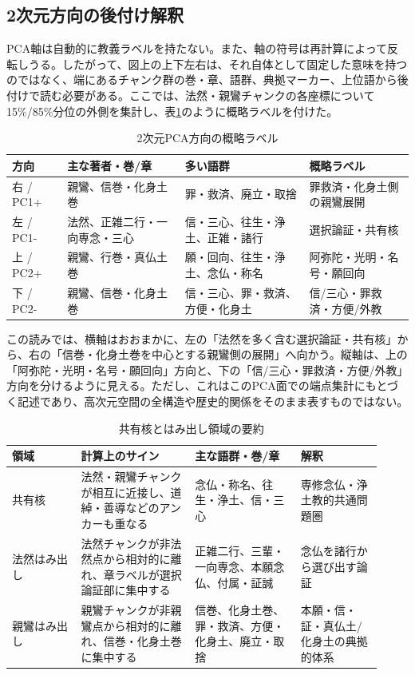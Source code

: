 \documentclass[uplatex,dvipdfmx,11pt,a4paper]{jsarticle}
\begin{document}
\subsection{2次元方向の後付け解釈}

PCA軸は自動的に教義ラベルを持たない。また、軸の符号は再計算によって反転しうる。したがって、図上の上下左右は、それ自体として固定した意味を持つのではなく、端にあるチャンク群の巻・章、語群、典拠マーカー、上位語から後付けで読む必要がある。ここでは、法然・親鸞チャンクの各座標について15\%/85\%分位の外側を集計し、表\ref{tab:pca-direction-reading}のように概略ラベルを付けた。

\begin{table}[H]
\centering
\small
\caption{2次元PCA方向の概略ラベル}
\label{tab:pca-direction-reading}
\begin{tabular}{@{}llll@{}}
\toprule
方向 & 主な著者・巻/章 & 多い語群 & 概略ラベル \\
\midrule
右 / PC1+ & 親鸞、信巻・化身土巻 & 罪・救済、廃立・取捨 & 罪救済・化身土側の親鸞展開 \\
左 / PC1- & 法然、正雑二行・一向専念・三心 & 信・三心、往生・浄土、正雑・諸行 & 選択論証・共有核 \\
上 / PC2+ & 親鸞、行巻・真仏土巻 & 願・回向、往生・浄土、念仏・称名 & 阿弥陀・光明・名号・願回向 \\
下 / PC2- & 親鸞、信巻・化身土巻 & 信・三心、罪・救済、方便・化身土 & 信/三心・罪救済・方便/外教 \\
\bottomrule
\end{tabular}
\end{table}

この読みでは、横軸はおおまかに、左の「法然を多く含む選択論証・共有核」から、右の「信巻・化身土巻を中心とする親鸞側の展開」へ向かう。縦軸は、上の「阿弥陀・光明・名号・願回向」方向と、下の「信/三心・罪救済・方便/外教」方向を分けるように見える。ただし、これはこのPCA面での端点集計にもとづく記述であり、高次元空間の全構造や歴史的関係をそのまま表すものではない。

\begin{table}[H]
\centering
\small
\caption{共有核とはみ出し領域の要約}
\label{tab:shared-protrusion-summary}
\begin{tabular}{@{}p{0.17\linewidth}p{0.29\linewidth}p{0.26\linewidth}p{0.20\linewidth}@{}}
\toprule
領域 & 計算上のサイン & 主な語群・巻/章 & 解釈 \\
\midrule
共有核 & 法然・親鸞チャンクが相互に近接し、道綽・善導などのアンカーも重なる & 念仏・称名、往生・浄土、信・三心 & 専修念仏・浄土教的共通問題圏 \\
法然はみ出し & 法然チャンクが非法然点から相対的に離れ、章ラベルが選択論証部に集中する & 正雑二行、三輩・一向専念、本願念仏、付属・証誠 & 念仏を諸行から選び出す論証 \\
親鸞はみ出し & 親鸞チャンクが非親鸞点から相対的に離れ、信巻・化身土巻に集中する & 信巻、化身土巻、罪・救済、方便・化身土、廃立・取捨 & 本願・信・証・真仏土/化身土の典拠的体系 \\
\bottomrule
\end{tabular}
\end{table}
\end{document}

